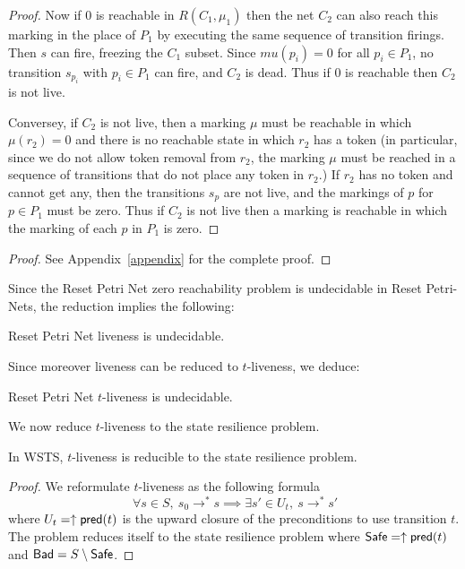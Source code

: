 \begin{proof}
Now if $0$ is reachable
in $R(C_1, \mu_1)$ 
then the net $C_2$ can also reach this marking
in the place of $P_1$ by executing the same sequence of transition firings.
Then $s$ can fire, freezing the $C_1$ subset.
Since $mu(p_i) = 0$ for all $p_i \in P_1$, no transition $s_{p_i}$ with $p_i \in P_1$ can fire, and $C_2$ is dead.
Thus if $0$ is reachable then $C_2$ is not live.

Conversey, if $C_2$ is not live, then a marking $\mu$ must be reachable in which 
$\mu(r_2) = 0$ and there is no reachable state in which $r_2$ has a token
(in particular, since we do not allow token removal from $r_2$, the marking $\mu$ must be reached in a sequence of transitions that do not place any token in $r_2$.)
If $r_2$ has no token and cannot get any, then the transitions $s_p$ are not live, and the markings of $p$ for $p \in P_1$ must be zero. 
Thus if $C_2$ is not live then a marking is reachable in which the marking of each $p$ in $P_1$ is zero. 

\end{proof}
\fi

\begin{proof}
See Appendix~\ref{appendix} for the complete proof.
\end{proof}


Since the Reset Petri Net zero reachability problem is undecidable in Reset Petri-Nets, the reduction implies the following:

\begin{corollary}
Reset Petri Net liveness is undecidable.
\end{corollary}

Since moreover liveness can be reduced to 
$t$-liveness, we deduce:

\begin{corollary}
Reset Petri Net $t$-liveness is undecidable.
\end{corollary}

We now reduce $t$-liveness to the state resilience problem.

\begin{proposition}\label{reductions}
In WSTS, $t$-liveness is reducible to the state resilience problem.
\end{proposition}


\begin{proof}
We reformulate $t$-liveness as the following formula
$$ ~ \forall s \in S, ~ s_0 \rightarrow^* s \implies \exists s' \in U_t, ~ s \rightarrow^{*} s'$$  
where
$U_t=\uparrow \textsf{pred}(t)$
is the upward closure of the preconditions to use transition $t$.  
The problem reduces itself to the state resilience problem
where $\textsf{Safe} = \uparrow \textsf{pred}(t)$ and $\textsf{Bad} = S \setminus \textsf{Safe}$.

\end{proof}



